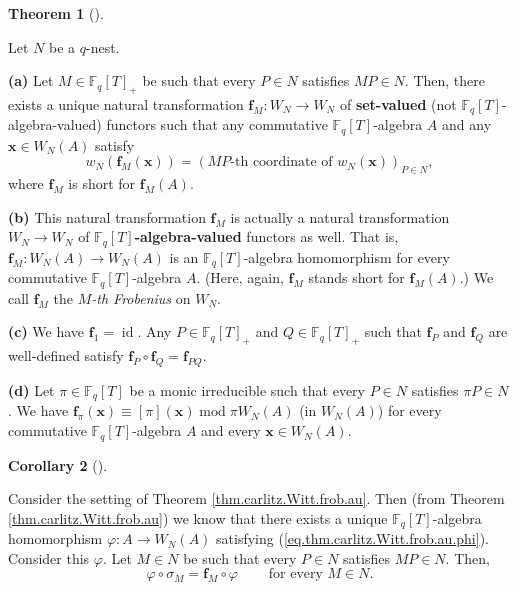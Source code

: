 \documentclass[numbers=enddot,12pt,final,onecolumn,notitlepage]{scrartcl}%
\theoremstyle{definition}
\newtheorem{theo}{Theorem}[section]
\newenvironment{theorem}[1][]
{\begin{theo}[#1]\begin{leftbar}}
{\end{leftbar}\end{theo}}
\newtheorem{coro}[theo]{Corollary}
\newenvironment{corollary}[1][]
{\begin{coro}[#1]\begin{leftbar}}
{\end{leftbar}\end{coro}}
\begin{document}
\begin{theorem}
\label{thm.carlitz.Witt.frob}Let $N$ be a $q$-nest.

\textbf{(a)} Let $M\in\mathbb{F}_{q}\left[  T\right]  _{+}$ be such that every
$P\in N$ satisfies $MP\in N$. Then, there exists a unique natural
transformation $\mathbf{f}_{M}:W_{N}\rightarrow W_{N}$ of \textbf{set-valued}
(not $\mathbb{F}_{q}\left[  T\right]  $-algebra-valued) functors such that any
commutative $\mathbb{F}_{q}\left[  T\right]  $-algebra $A$ and any
$\mathbf{x}\in W_{N}\left(  A\right)  $ satisfy%
\[
w_{N}\left(  \mathbf{f}_{M}\left(  \mathbf{x}\right)  \right)  =\left(
MP\text{-th coordinate of }w_{N}\left(  \mathbf{x}\right)  \right)  _{P\in
N},
\]
where $\mathbf{f}_{M}$ is short for $\mathbf{f}_{M}\left(  A\right)  $.

\textbf{(b)} This natural transformation $\mathbf{f}_{M}$ is actually a
natural transformation $W_{N}\rightarrow W_{N}$ of $\mathbb{F}_{q}\left[
T\right]  $\textbf{-algebra-valued} functors as well. That is, $\mathbf{f}%
_{M}:W_{N}\left(  A\right)  \rightarrow W_{N}\left(  A\right)  $ is an
$\mathbb{F}_{q}\left[  T\right]  $-algebra homomorphism for every commutative
$\mathbb{F}_{q}\left[  T\right]  $-algebra $A$. (Here, again, $\mathbf{f}_{M}$
stands short for $\mathbf{f}_{M}\left(  A\right)  $.) We call $\mathbf{f}_{M}$
the $M$\textit{-th Frobenius} on $W_{N}$.

\textbf{(c)} We have $\mathbf{f}_{1}=\operatorname*{id}$. Any $P\in
\mathbb{F}_{q}\left[  T\right]  _{+}$ and $Q\in\mathbb{F}_{q}\left[  T\right]
_{+}$ such that $\mathbf{f}_{P}$ and $\mathbf{f}_{Q}$ are well-defined satisfy
$\mathbf{f}_{P}\circ\mathbf{f}_{Q}=\mathbf{f}_{PQ}$.

\textbf{(d)} Let $\pi\in\mathbb{F}_{q}\left[  T\right]  $ be a monic
irreducible such that every $P\in N$ satisfies $\pi P\in N$. We have
$\mathbf{f}_{\pi}\left(  \mathbf{x}\right)  \equiv\left[  \pi\right]  \left(
\mathbf{x}\right)  \operatorname{mod}\pi W_{N}\left(  A\right)  $ (in
$W_{N}\left(  A\right)  $) for every commutative $\mathbb{F}_{q}\left[
T\right]  $-algebra $A$ and every $\mathbf{x}\in W_{N}\left(  A\right)  $.
\end{theorem}

\begin{corollary}
\label{cor.carlitz.Witt.frob.au.preserves-frob}Consider the setting of Theorem
\ref{thm.carlitz.Witt.frob.au}. Then (from Theorem
\ref{thm.carlitz.Witt.frob.au}) we know that there exists a unique
$\mathbb{F}_{q}\left[  T\right]  $-algebra homomorphism $\varphi:A\rightarrow
W_{N}\left(  A\right)  $ satisfying (\ref{eq.thm.carlitz.Witt.frob.au.phi}).
Consider this $\varphi$. Let $M\in N$ be such that every $P\in N$ satisfies
$MP\in N$. Then,%
\[
\varphi\circ\sigma_{M}=\mathbf{f}_{M}\circ\varphi\ \ \ \ \ \ \ \ \ \ \text{for
every }M\in N.
\]

\end{corollary}
\end{document}
